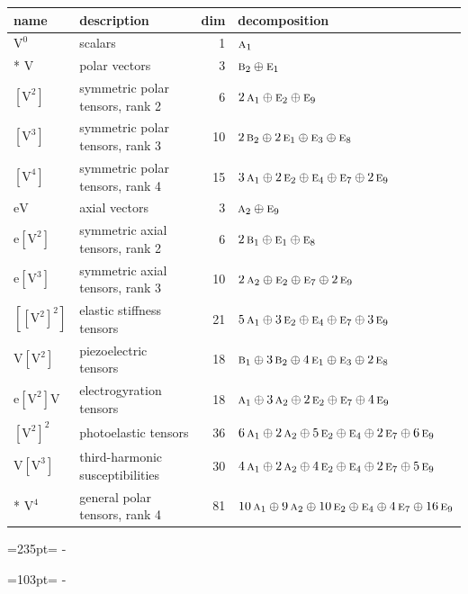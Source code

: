 \documentclass[10pt,a4paper]{article}
\newcommand{\needspace}[1]{\par\penalty-100\begingroup\dimen0=#1\relax\dimen2=\pagegoal
  \advance\dimen2-\pagetotal\ifdim\dimen0>\dimen2\relax\ifdim\dimen2>0pt\vfil\break\fi\fi
  \endgroup}
\numberwithin{equation}{section}
\newcommand{\irr}[1]{\text{\normalfont\scshape #1}}
\newcommand{\jahn}[1]{\mathrm{#1}}
\newlength{\fillwidth}\newlength{\cellwidth}\newlength{\colwidth}
\begin{document}
{\begin{longtable}{@{}llr>{\RaggedRight\arraybackslash}p{\fillwidth}@{}}
name & description & dim & decomposition\\\midrule\endhead
\bottomrule\endfoot\endlastfoot
$\jahn{V^{0}}$ & scalars & 1 & $\irr{a}_{1}$\\*
$\jahn{V}$ & polar vectors & 3 & $\irr{b}_{2} \oplus\allowbreak \irr{e}_{1}$\\
$\jahn{[V^{2}]}$ & symmetric polar tensors, rank 2 & 6 & $2\,\irr{a}_{1} \oplus\allowbreak \irr{e}_{2} \oplus\allowbreak \irr{e}_{9}$\\
$\jahn{[V^{3}]}$ & symmetric polar tensors, rank 3 & 10 & $2\,\irr{b}_{2} \oplus\allowbreak 2\,\irr{e}_{1} \oplus\allowbreak \irr{e}_{3} \oplus\allowbreak \irr{e}_{8}$\\
$\jahn{[V^{4}]}$ & symmetric polar tensors, rank 4 & 15 & $3\,\irr{a}_{1} \oplus\allowbreak 2\,\irr{e}_{2} \oplus\allowbreak \irr{e}_{4} \oplus\allowbreak \irr{e}_{7} \oplus\allowbreak 2\,\irr{e}_{9}$\\
$\jahn{eV}$ & axial vectors & 3 & $\irr{a}_{2} \oplus\allowbreak \irr{e}_{9}$\\
$\jahn{e[V^{2}]}$ & symmetric axial tensors, rank 2 & 6 & $2\,\irr{b}_{1} \oplus\allowbreak \irr{e}_{1} \oplus\allowbreak \irr{e}_{8}$\\
$\jahn{e[V^{3}]}$ & symmetric axial tensors, rank 3 & 10 & $2\,\irr{a}_{2} \oplus\allowbreak \irr{e}_{2} \oplus\allowbreak \irr{e}_{7} \oplus\allowbreak 2\,\irr{e}_{9}$\\
$\jahn{[[V^{2}]^{2}]}$ & elastic stiffness tensors & 21 & $5\,\irr{a}_{1} \oplus\allowbreak 3\,\irr{e}_{2} \oplus\allowbreak \irr{e}_{4} \oplus\allowbreak \irr{e}_{7} \oplus\allowbreak 3\,\irr{e}_{9}$\\
$\jahn{V[V^{2}]}$ & piezoelectric tensors & 18 & $\irr{b}_{1} \oplus\allowbreak 3\,\irr{b}_{2} \oplus\allowbreak 4\,\irr{e}_{1} \oplus\allowbreak \irr{e}_{3} \oplus\allowbreak 2\,\irr{e}_{8}$\\
$\jahn{e[V^{2}]V}$ & electrogyration tensors & 18 & $\irr{a}_{1} \oplus\allowbreak 3\,\irr{a}_{2} \oplus\allowbreak 2\,\irr{e}_{2} \oplus\allowbreak \irr{e}_{7} \oplus\allowbreak 4\,\irr{e}_{9}$\\
$\jahn{[V^{2}]^{2}}$ & photoelastic tensors & 36 & $6\,\irr{a}_{1} \oplus\allowbreak 2\,\irr{a}_{2} \oplus\allowbreak 5\,\irr{e}_{2} \oplus\allowbreak \irr{e}_{4} \oplus\allowbreak 2\,\irr{e}_{7} \oplus\allowbreak 6\,\irr{e}_{9}$\\
$\jahn{V[V^{3}]}$ & third-harmonic susceptibilities & 30 & $4\,\irr{a}_{1} \oplus\allowbreak 2\,\irr{a}_{2} \oplus\allowbreak 4\,\irr{e}_{2} \oplus\allowbreak \irr{e}_{4} \oplus\allowbreak 2\,\irr{e}_{7} \oplus\allowbreak 5\,\irr{e}_{9}$\\*
$\jahn{V^{4}}$ & general polar tensors, rank 4 & 81 & $10\,\irr{a}_{1} \oplus\allowbreak 9\,\irr{a}_{2} \oplus\allowbreak 10\,\irr{e}_{2} \oplus\allowbreak \irr{e}_{4} \oplus\allowbreak 4\,\irr{e}_{7} \oplus\allowbreak 16\,\irr{e}_{9}$\\
\bottomrule\end{longtable}}
\needspace{235pt}
\needspace{103pt}
\end{document}
